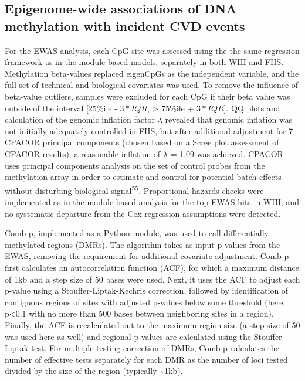 \documentclass[]{article}
\theoremstyle{definition}
\theoremstyle{definition}
\theoremstyle{definition}
\theoremstyle{remark}
\begin{document}
\subsection{Epigenome-wide associations of DNA methylation with incident
CVD
events}\label{epigenome-wide-associations-of-dna-methylation-with-incident-cvd-events}

For the EWAS analysis, each CpG site was assessed using the the same
regression framework as in the module-based models, separately in both
WHI and FHS. Methylation beta-values replaced eigenCpGs as the
independent variable, and the full set of technical and biological
covariates was used. To remove the influence of beta-value outliers,
samples were excluded for each CpG if their beta value was outside of
the interval {[}25\%ile - \(3*IQR\), \textgreater{} 75\%ile +
\(3*IQR\){]}. QQ plots and calculation of the genomic inflation factor
\(\lambda\) revealed that genomic inflation was not initially adequately
controlled in FHS, but after additional adjustment for 7 CPACOR
principal components (chosen based on a Scree plot assessment of CPACOR
results), a reasonable inflation of \(\lambda\) = 1.09 was achieved.
CPACOR uses principal components analysis on the set of control probes
from the methylation array in order to estimate and control for
potential batch effects without disturbing biological
signal\textsuperscript{55}. Proportional hazards checks were implemented
as in the module-based analysis for the top EWAS hits in WHI, and no
systematic departure from the Cox regression assumptions were detected.

Comb-p, implemented as a Python module, was used to call differentially
methylated regions (DMRs). The algorithm takes as input p-values from
the EWAS, removing the requirement for additional covariate adjustment.
Comb-p first calculates an autocorrelation function (ACF), for which a
maximum distance of 1kb and a step size of 50 bases were used. Next, it
uses the ACF to adjust each p-value using a Stouffer-Liptak-Kechris
correction, followed by identification of contiguous regions of sites
with adjusted p-values below some threshold (here, p\textless{}0.1 with
no more than 500 bases between neighboring sites in a region). Finally,
the ACF is recalculated out to the maximum region size (a step size of
50 was used here as well) and regional p-values are calculated using the
Stouffer-Liptak test. For multiple testing correction of DMRs, Comb-p
calculates the number of effective tests separately for each DMR as the
number of loci tested divided by the size of the region (typically
\textasciitilde{}1kb).
\end{document}
